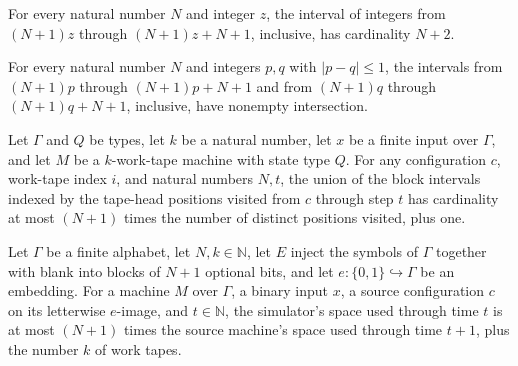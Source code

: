 \begin{lemma}
\label{Turing.FinTM.arSpaceBlock_card}
\leanok
{}
For every natural number $N$ and integer $z$, the interval of integers from $(N+1)z$
through $(N+1)z+N+1$, inclusive, has cardinality $N+2$.
\end{lemma}

\begin{lemma}
\label{Turing.FinTM.arSpaceBlock_inter}
\leanok
{}
For every natural number $N$ and integers $p,q$ with $|p-q|\le 1$, the intervals from
$(N+1)p$ through $(N+1)p+N+1$ and from $(N+1)q$ through $(N+1)q+N+1$, inclusive, have
nonempty intersection.
\end{lemma}

\begin{lemma}
\label{Turing.FinTM.arSpaceCover_card}
\leanok
{}
Let $\Gamma$ and $Q$ be types, let $k$ be a natural number, let $x$ be a finite input
over $\Gamma$, and let $M$ be a $k$-work-tape machine with state type $Q$. For any
configuration $c$, work-tape index $i$, and natural numbers $N,t$, the union of the
block intervals indexed by the tape-head positions visited from $c$ through step $t$ has
cardinality at most $(N+1)$ times the number of distinct positions visited, plus one.
\end{lemma}

\begin{lemma}
\label{Turing.FinTM.arTM_spaceUsed}
\leanok
{}
Let $\Gamma$ be a finite alphabet, let $N,k\in\mathbb{N}$, let $E$ inject the symbols of
$\Gamma$ together with blank into blocks of $N+1$ optional bits, and let
$e:\{0,1\}\hookrightarrow\Gamma$ be an embedding. For a machine $M$ over $\Gamma$, a
binary input $x$, a source configuration $c$ on its letterwise $e$-image, and
$t\in\mathbb{N}$, the simulator's space used through time $t$ is at most $(N+1)$ times
the source machine's space used through time $t+1$, plus the number $k$ of work tapes.
\end{lemma}

